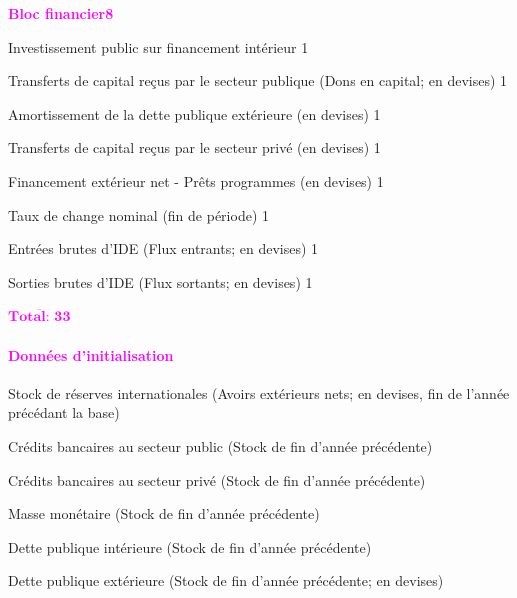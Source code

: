 \documentclass[11pt,a4paper]{article}
\newcommand{\AMORTG}{\mathit{AMORTG}}
\newcommand{\DCG}{\mathit{DCG}}
\newcommand{\DCP}{\mathit{DCP}}
\newcommand{\DINVG}{\mathit{DINVG}}
\newcommand{\ER}{\mathit{ER}}
\newcommand{\FDI}{\mathit{FDI}}
\newcommand{\KTRAG}{\mathit{KTRAG}}
\newcommand{\MD}{\mathit{MD}}
\newcommand{\NDDG}{\mathit{NDDG}}
\newcommand{\NFDG}{\mathit{NFDG}}
\newcommand{\OTHKTRA}{\mathit{OTHKTRA}}
\newcommand{\RES}{\mathit{RES}}
\newcommand{\redparagraph}[1]{\paragraph*{\large\textcolor{Fuchsia}{#1}}}
\begin{document}
	\noindent\textcolor{Fuchsia}{\textbf{Bloc financier}}\hfill \textcolor{Fuchsia}{\textbf{8}}
	\begin{description}[leftmargin=!,labelwidth=\widthof{\bfseries AAAAAAAA},parsep=9.7pt]	
		\item[$\DINVG$]           Investissement public sur financement intérieur	\hfill 1
		\item[$\KTRAG$]            Transferts de capital reçus par le secteur publique (Dons en capital; en devises)	\hfill 1
		\item[$\AMORTG$]          Amortissement de la dette publique extérieure (en devises)	\hfill 1
		\item[$\OTHKTRA$]          Transferts de capital reçus par le secteur privé (en devises)	\hfill 1
		\item[$\Delta\NFDG^{\mathit{prg}}$]      Financement extérieur net - Prêts programmes (en devises)	\hfill 1
		\item[$\ER$]              Taux de change nominal (fin de période)	\hfill 1
		\item[$\FDI^{\mathit{IN}}$]          Entrées brutes d'IDE (Flux entrants; en devises)	\hfill 1
		\item[$\FDI^{\mathit{OUT}}$]         Sorties brutes d'IDE (Flux sortants; en devises)	\hfill 1
		
		\hfill \textcolor{Fuchsia}{$\overline{\textbf{Total: 33}}$}
	\end{description}
	
	
	\redparagraph{Données d'initialisation}
	\begin{description}[leftmargin=!,labelwidth=\widthof{\bfseries AAAAAAAA},parsep=9.7pt]    
		\item[$\RES_{\mathit{-1}}$] Stock de réserves internationales (Avoirs extérieurs nets; en devises, fin de l'année précédant la base)
		\item[$\DCG_{-1}$] Crédits bancaires au secteur public (Stock de fin d'année précédente)    
		\item[$\DCP_{-1}$] Crédits bancaires au secteur privé (Stock de fin d'année précédente)    
		\item[$\MD_{-1}$]  Masse monétaire (Stock de fin d'année précédente)
		\item[$\NDDG_{-1}$] Dette publique intérieure (Stock de fin d'année précédente) 
		\item[$\NFDG_{-1}$] Dette publique extérieure (Stock de fin d'année précédente; en devises) 
	\end{description}
	
\end{document}

